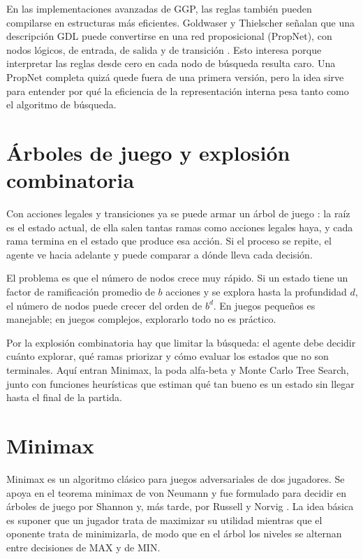 En las implementaciones avanzadas de GGP, las reglas también pueden compilarse en estructuras más eficientes. Goldwaser y Thielscher señalan que una descripción GDL puede convertirse en una red proposicional (PropNet), con nodos lógicos, de entrada, de salida y de transición \cite{Goldwaser2020DRLGGP}. Esto interesa porque interpretar las reglas desde cero en cada nodo de búsqueda resulta caro. Una PropNet completa quizá quede fuera de una primera versión, pero la idea sirve para entender por qué la eficiencia de la representación interna pesa tanto como el algoritmo de búsqueda.

\section{Árboles de juego y explosión combinatoria}
\label{sec:explosion_combinatoria}

Con acciones legales y transiciones ya se puede armar un árbol de juego \cite{RussellNorvig2010}: la raíz es el estado actual, de ella salen tantas ramas como acciones legales haya, y cada rama termina en el estado que produce esa acción. Si el proceso se repite, el agente ve hacia adelante y puede comparar a dónde lleva cada decisión.

El problema es que el número de nodos crece muy rápido. Si un estado tiene un factor de ramificación promedio de \(b\) acciones y se explora hasta la profundidad \(d\), el número de nodos puede crecer del orden de \(b^d\). En juegos pequeños es manejable; en juegos complejos, explorarlo todo no es práctico.

Por la explosión combinatoria hay que limitar la búsqueda: el agente debe decidir cuánto explorar, qué ramas priorizar y cómo evaluar los estados que no son terminales. Aquí entran Minimax, la poda alfa-beta y Monte Carlo Tree Search, junto con funciones heurísticas que estiman qué tan bueno es un estado sin llegar hasta el final de la partida.

\section{Minimax}

Minimax es un algoritmo clásico para juegos adversariales de dos jugadores. Se apoya en el teorema minimax de von Neumann \cite{VonNeumann1928} y fue formulado para decidir en árboles de juego por Shannon \cite{Shannon1950} y, más tarde, por Russell y Norvig \cite{RussellNorvig2010}. La idea básica es suponer que un jugador trata de maximizar su utilidad mientras que el oponente trata de minimizarla, de modo que en el árbol los niveles se alternan entre decisiones de MAX y de MIN.

